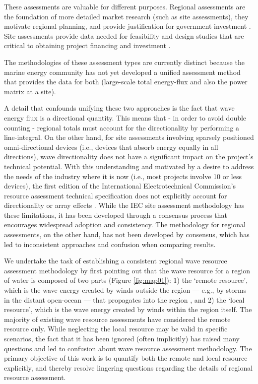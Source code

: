 These assessments are valuable for different purposes. Regional assessments are the foundation of more detailed market research (such as site assessments), they motivate regional planning, and provide justification for government investment \citep[e.g., ][]{EPRIwaveresource2011,gunnQuantifyingGlobalWave2012,regueroGlobalWavePower2015,motaWaveEnergyPotential2014}. Site assessments provide data needed for feasibility and design studies that are critical to obtaining project financing and investment \citep[]{robertsonCharacterizingShoreWave2014,iglesiasWaveEnergyPotential2009}.

The methodologies of these assessment types are currently distinct because the marine energy community has not yet developed a unified assessment method that provides the data for both (large-scale total energy-flux and also the power matrix at a site). 

A detail that confounds unifying these two approaches is the fact that wave energy flux is a directional quantity. This means that - in order to avoid double counting - regional totals must account for the directionality by performing a line-integral. On the other hand, for site assessments involving sparsely positioned omni-directional devices (i.e., devices that absorb energy equally in all directions), wave directionality does not have a significant impact on the project’s technical potential. With this understanding and motivated by a desire to address the needs of the industry where it is now (i.e., most projects involve 10 or less devices), the first edition of the International Electrotechnical Commission’s resource assessment technical specification does not explicitly account for directionality or array effects \citep[]{internationalelectrotechnicalcommissionPart101Wave2015}. While the IEC site assessment methodology has these limitations, it has been developed through a consensus process that encourages widespread adoption and consistency. The methodology for regional assessments, on the other hand, has not been developed by consensus, which has led to inconsistent approaches and confusion when comparing results.

We undertake the task of establishing a consistent regional wave resource assessment methodology by first pointing out that the wave resource for a region of water is composed of two parts (Figure \ref{fig:map01}): 1) the ‘remote resource’, which is the wave energy created by winds outside the region — e.g., by storms in the distant open-ocean — that propagates into the region \citep{gunnQuantifyingGlobalWave2012, hemerRevisedAssessmentAustralia2017}, and 2) the ‘local resource’, which is the wave energy created by winds within the region itself. The majority of existing wave resource assessments have considered the remote resource only. While neglecting the local resource may be valid in specific scenarios, the fact that it has been ignored (often implicitly) has raised many questions and led to confusion about wave resource assessment methodology. The primary objective of this work is to quantify both the remote and local resource explicitly, and thereby resolve lingering questions regarding the details of regional resource assessment.

